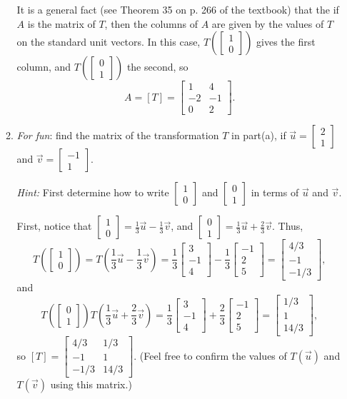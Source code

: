 \documentclass[12pt]{article}
\newcommand{\bbm}{\begin{bmatrix}}
\newcommand{\ebm}{\end{bmatrix}}
\begin{document}
\begin{enumerate}
\begin{enumerate}
It is a general fact (see Theorem 35 on p. 266 of the textbook) that the if $A$ is the matrix of $T$, then the columns of $A$ are given by the values of $T$ on the standard unit vectors. In this case, $T\left(\bbm 1\\0\ebm\right)$ gives the first column, and $T\left(\bbm 0\\1\ebm\right)$
the second, so
\[
A=[T] = \bbm 1&4\\-2&-1\\0&2\ebm.
\]
\item \textit{For fun}: find the matrix of the transformation $T$ in part(a), if $\vec{u}=\bbm 2\\1\ebm$ and $\vec{v}=\bbm -1\\1\ebm$.

\textit{Hint:} First determine how to write $\bbm 1\\0\ebm$ and $\bbm 0\\1\ebm$ in terms of $\vec{u}$ and $\vec{v}$. 

First, notice that $\bbm 1\\0\ebm =\frac 13\vec{u}-\frac13 \vec{v}$, and $\bbm 0\\1\ebm = \frac13 \vec{u}+\frac23\vec{v}$. Thus,
\[
T\left(\bbm 1\\0\ebm\right) = T(\frac13 \vec{u}-\frac13\vec{v}) = \frac13\bbm 3\\-1\\4\ebm-\frac13\bbm -1\\2\\5\ebm = \bbm 4/3\\-1\\-1/3\ebm,
\]
and
\[
T\left(\bbm 0\\1 \ebm\right) T(\frac13\vec{u}+\frac23\vec{v}) = \frac13\bbm 3\\-1\\4\ebm +\frac23 \bbm -1\\2\\5\ebm = \bbm 1/3\\1\\14/3\ebm,
\]
so $[T] = \bbm 4/3&1/3\\-1&1\\-1/3&14/3\ebm$. (Feel free to confirm the values of $T(\vec{u})$ and $T(\vec{v})$ using this matrix.)
\end{enumerate}

 \end{enumerate}
 
\end{document}

